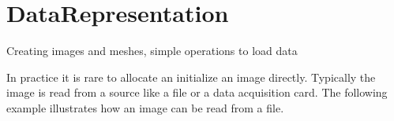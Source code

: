 
\chapter{DataRepresentation}

Creating images and meshes, simple operations to load data


%
%



In practice it is rare to allocate an initialize an image directly.
Typically the image is read from a source like a file or a data acquisition
card. The following example illustrates how an image can be read from
a file.









